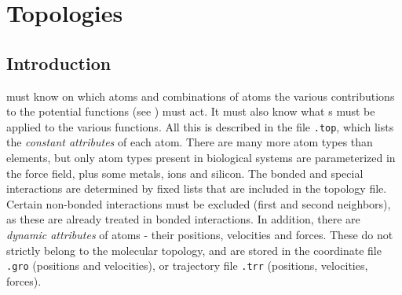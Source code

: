 %
%
%
%
%
%
%

\chapter{Topologies}
\label{ch:top}
\section{Introduction}
{\gromacs} must know on which atoms and combinations of atoms the
various contributions to the potential functions (see
) must act. It must
also know what s must be applied to the various
functions. All this is described in the {\em {}} file
{\tt *.top}, which lists the {\em constant attributes} of each atom.
There are many more atom types than elements, but only atom types
present in biological systems are parameterized in the force field,
plus some metals, ions and silicon. The bonded and special
interactions are determined by fixed lists that are included in the
topology file. Certain non-bonded interactions must be excluded (first
and second neighbors), as these are already treated in bonded
interactions.  In addition, there are {\em dynamic attributes} of
atoms - their positions, velocities and forces. These do not
strictly belong to the molecular topology, and are stored in the
coordinate file {\tt *.gro} (positions and velocities), or trajectory
file {\tt *.trr} (positions, velocities, forces).

